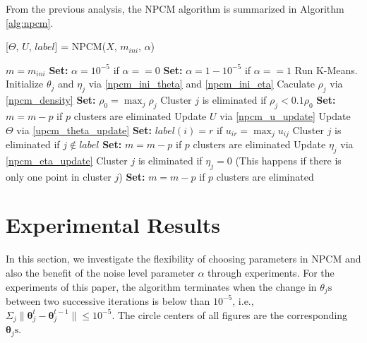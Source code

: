 \documentclass[conference]{IEEEtran}
\theoremstyle{definition}
\begin{document}
From the previous analysis, the NPCM algorithm is summarized in Algorithm \ref{alg:npcm}.
\begin{algorithm}
\caption{ [$\Theta$, $U$, $label$] = NPCM($X$, $m_{ini}$, $\alpha$)}
\label{alg:npcm}
\begin{algorithmic}[1]
\State $m=m_{ini}$
\State \textbf{Set:} $\alpha=10^{-5}$ if $\alpha==0$
\State \textbf{Set:} $\alpha=1-10^{-5}$ if $\alpha==1$
\State Run K-Means.
\State Initialize $\theta_j$ and $\eta_j$ via \eqref{npcm_ini_theta} and \eqref{npcm_ini_eta}
\State Caculate $\rho_j$ via \eqref{npcm_density}
\State \textbf{Set:} $\rho_0=\max_j\rho_j$
\State Cluster $j$ is eliminated if $\rho_j<0.1\rho_0$
\State \textbf{Set:} $m=m-p$ if $p$ clusters are eliminated
\Repeat
\State Update $U$ via \eqref{npcm_u_update}
\State Update $\Theta$ via \eqref{upcm_theta_update}
\State \textbf{Set:} $label(i)=r$ if $u_{ir}=\max_j u_{ij}$
\EndFor
\State Cluster $j$ is eliminated if $j \notin label$
\State \textbf{Set:} $m=m-p$ if  $p$ clusters are eliminated
\State Update $\eta_j$ via \eqref{npcm_eta_update}
\State Cluster $j$ is eliminated if $\eta_j=0$ (This happens if there is only one point in cluster $j$)
\State \textbf{Set:} $m=m-p$ if  $p$ clusters are eliminated
\\
\end{algorithmic}
\end{algorithm}
\section{Experimental Results}
\label{sec-4}
In this section, we investigate the flexibility of choosing parameters in NPCM and also the benefit of the noise level parameter $\alpha$ through experiments. For the experiments of this paper, the algorithm terminates when the change in $\theta_j\text{s}$ between two successive iterations is below than $10^{-5}$, i.e., $\Sigma_j\|\boldsymbol{\theta}_j^{t}-\boldsymbol{\theta}_j^{t-1}\|\leq10^{-5}$. The circle centers of all figures are the corresponding $\boldsymbol{\theta}_j\text{s}$.
\end{document}
